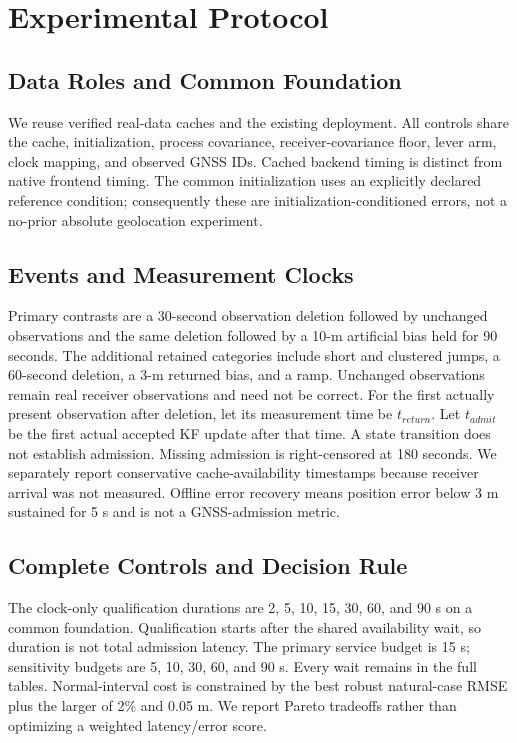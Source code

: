 \documentclass[conference]{IEEEtran}
\begin{document}
\section{Experimental Protocol}
\subsection{Data Roles and Common Foundation}
We reuse verified real-data caches and the existing deployment. All controls share the cache, initialization, process covariance, receiver-covariance floor, lever arm, clock mapping, and observed GNSS IDs. Cached backend timing is distinct from native frontend timing. The common initialization uses an explicitly declared reference condition; consequently these are initialization-conditioned errors, not a no-prior absolute geolocation experiment.

\subsection{Events and Measurement Clocks}
Primary contrasts are a 30-second observation deletion followed by unchanged observations and the same deletion followed by a 10-m artificial bias held for 90 seconds. The additional retained categories include short and clustered jumps, a 60-second deletion, a 3-m returned bias, and a ramp. Unchanged observations remain real receiver observations and need not be correct.
For the first actually present observation after deletion, let its measurement time be $t_{return}$. Let $t_{admit}$ be the first actual accepted KF update after that time. A state transition does not establish admission. Missing admission is right-censored at 180 seconds. We separately report conservative cache-availability timestamps because receiver arrival was not measured. Offline error recovery means position error below 3 m sustained for 5 s and is not a GNSS-admission metric.

\subsection{Complete Controls and Decision Rule}
The clock-only qualification durations are 2, 5, 10, 15, 30, 60, and 90 s on a common foundation. Qualification starts after the shared availability wait, so duration is not total admission latency. The primary service budget is 15 s; sensitivity budgets are 5, 10, 30, 60, and 90 s. Every wait remains in the full tables. Normal-interval cost is constrained by the best robust natural-case RMSE plus the larger of 2\% and 0.05 m. We report Pareto tradeoffs rather than optimizing a weighted latency/error score.
\end{document}
